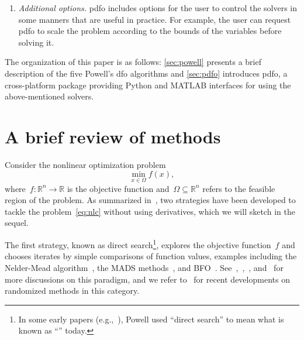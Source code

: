 \documentclass[11pt,draft]{article}
\numberwithin{equation}{section}
\newcommand{\R}{\mathbb{R}}
\newcommand{\fset}{\Omega}
\newcommand{\obj}{f}
\begin{document}
\begin{enumerate}
    \item \emph{Additional options.}
    \gls{pdfo} includes options for the user to control the solvers in some manners that are useful in practice.
    For example, the user can request \gls{pdfo} to scale the problem according to the bounds of the variables before solving it.
\end{enumerate}

The organization of this paper is as follows: \cref{sec:powell} presents a brief description of the five Powell's \gls{dfo} algorithms and \cref{sec:pdfo} introduces \gls{pdfo}, a cross-platform package providing Python and MATLAB interfaces for using the above-mentioned solvers.

\section{A brief review of  methods}

Consider the nonlinear optimization problem
\begin{equation}
    \label{eq:nlc}
    \min_{x \in \fset} \obj(x),
\end{equation}
where~$\obj : \R^n \to \R$ is the objective function and~$\fset \subseteq \R^n$ refers to the feasible region of the problem.
As summarized in~\cite{Conn_Scheinberg_Vicente_2009b}, two strategies have been developed to tackle the problem~\cref{eq:nlc} without using derivatives, which we will sketch in the sequel.

The first strategy, known as direct search\footnote{In some early papers
(e.g.,~\cite{Powell_1994,Powell_1998}), Powell used \enquote{direct search} to mean what is known as \enquote{} today.}, explores the objective function~$\obj$ and chooses iterates by simple comparisons of function values, examples including the Nelder-Mead algorithm~\cite{Nelder_Mead_1965}, the MADS methods~\cite{Audet_Dennis_2006,Abramson_Audet_2006,Digabel_2011}, and BFO~\cite{Porcelli_Toint_2017,Porcelli_Toint_2020,Porcelli_Toint_2022}.
See~\cite{Kolda_Lewis_Torczon_2003},~\cite[Chapters~7 and~8]{Conn_Scheinberg_Vicente_2009b},~\cite[Part~3]{Audet_Hare_2017}, and~\cite[\S~2.1]{Larson_Menickelly_Wild_2019} for more discussions on this paradigm, and we refer to~\cite{Gratton_Etal_2015,Gratton_Etal_2019} for recent developments on randomized methods in this category.
\end{document}
